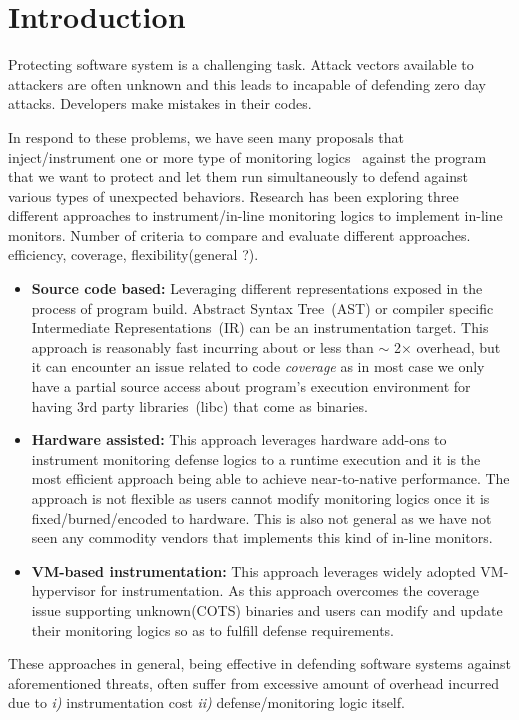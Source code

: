 \section{Introduction} 
\label{sec:intro}

Protecting software system is a challenging task. 
%
Attack vectors available to attackers are often unknown and this leads to
incapable of defending zero day attacks.
%
Developers make mistakes in their codes.

%
In respond to these problems, we have seen many proposals that
inject/instrument one or more type of monitoring logics~\cite{cfi, memcheck,
dft} against the program that we want to protect and let them run
simultaneously to defend against various types of unexpected behaviors.
%
Research has been exploring three different approaches to instrument/in-line
monitoring logics to implement in-line monitors.
%
Number of criteria to compare and evaluate different approaches. efficiency,
coverage, flexibility(general ?).

\begin{itemize}
%
    \item {\bf Source code based:} Leveraging different representations exposed
in the process of program build. Abstract Syntax Tree~(AST) or compiler
specific Intermediate Representations~(IR) can be an instrumentation target.
This approach is reasonably fast incurring about or less than $\sim$ 2$\times$
overhead, but it can encounter an issue related to code {\it coverage} as in
most case we only have a partial source access about program's execution
environment for having 3rd party libraries~(\ie libc) that come as binaries.
%
    \item {\bf Hardware assisted:} This approach leverages hardware add-ons to
instrument monitoring defense logics to a runtime execution and it is the most
efficient approach being able to achieve near-to-native performance. The
approach is not flexible as users cannot modify monitoring logics once it is
fixed/burned/encoded to hardware. This is also not general as we have not seen
any commodity vendors that implements this kind of in-line monitors.
%
    \item {\bf VM-based instrumentation:}  This approach leverages widely
adopted VM-hypervisor for instrumentation. As this approach overcomes the
coverage issue supporting unknown(COTS) binaries and users can modify and
update their monitoring logics so as to fulfill defense
requirements.

\end{itemize}
%
These approaches in general, being effective in defending software systems
against aforementioned threats, often suffer from excessive amount of overhead
incurred due to {\it i)} instrumentation cost {\it ii)} defense/monitoring
logic itself.


